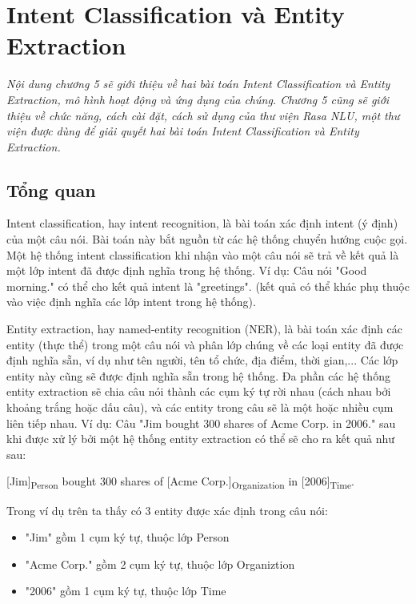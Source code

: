 \chapter{Intent Classification và Entity Extraction}
\ifpdf
    \graphicspath{{Chapter5/Chapter5Figs/PNG/}{Chapter5/Chapter5Figs/PDF/}{Chapter5/Chapter5Figs/}}
\else
    \graphicspath{{Chapter5/Chapter5Figs/EPS/}{Chapter5/Chapter5Figs/}}
\fi

\textit{Nội dung chương 5 sẽ giới thiệu về hai bài toán Intent Classification và Entity Extraction, mô hình hoạt động và ứng dụng của chúng. Chương 5 cũng sẽ giới thiệu về chức năng, cách cài đặt, cách sử dụng của thư viện Rasa NLU, một thư viện được dùng để giải quyết hai bài toán Intent Classification và Entity Extraction.}

\section{Tổng quan}

Intent classification, hay intent recognition, là bài toán xác định intent (ý định) của một câu nói. Bài toán này bắt nguồn từ các hệ thống chuyển hướng cuộc gọi. Một hệ thống intent classification khi nhận vào một câu nói sẽ trả về kết quả là một lớp intent đã được định nghĩa trong hệ thống. Ví dụ: Câu nói "Good morning." có thể cho kết quả intent là "greetings". (kết quả có thể khác phụ thuộc vào việc định nghĩa các lớp intent trong hệ thống).

Entity extraction, hay named-entity recognition (NER), là bài toán xác định các entity (thực thể) trong một câu nói và phân lớp chúng về các loại entity đã được định nghĩa sẵn, ví dụ như tên người, tên tổ chức, địa điểm, thời gian,... Các lớp entity này cũng sẽ được định nghĩa sẵn trong hệ thống. Đa phần các hệ thống entity extraction sẽ chia câu nói thành các cụm ký tự rời nhau (cách nhau bởi khoảng trắng hoặc dấu câu), và các entity trong câu sẽ là một hoặc nhiều cụm liên tiếp nhau. Ví dụ: Câu "Jim bought 300 shares of Acme Corp. in 2006." sau khi được xử lý bởi một hệ thống entity extraction có thể sẽ cho ra kết quả như sau:

[Jim]\textsubscript{Person} bought 300 shares of [Acme Corp.]\textsubscript{Organization} in [2006]\textsubscript{Time}.

Trong ví dụ trên ta thấy có 3 entity được xác định trong câu nói:
\begin{itemize}
    \item "Jim" gồm 1 cụm ký tự, thuộc lớp Person
    \item "Acme Corp." gồm 2 cụm ký tự, thuộc lớp Organiztion
    \item "2006" gồm 1 cụm ký tự, thuộc lớp Time
\end{itemize}

